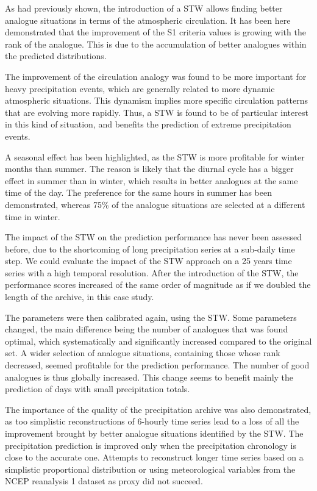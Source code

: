 \documentclass[hess]{copernicus}
\begin{document}
As \citet{Finet2008} had previously shown, the introduction of a STW allows finding better analogue situations in terms of the atmospheric circulation. It has been here demonstrated that the improvement of the S1 criteria values is growing with the rank of the analogue. This is due to the accumulation of better analogues within the predicted distributions.

The improvement of the circulation analogy was found to be more important for heavy precipitation events, which are generally related to more dynamic atmospheric situations. This dynamism implies more specific circulation patterns that are evolving more rapidly. Thus, a STW is found to be of particular interest in this kind of situation, and benefits the prediction of extreme precipitation events.

A seasonal effect has been highlighted, as the STW is more profitable for winter months than summer. The reason is likely that the diurnal cycle has a bigger effect in summer than in winter, which results in better analogues at the same time of the day. The preference for the same hours in summer has been demonstrated, whereas 75\% of the analogue situations are selected at a different time in winter.

The impact of the STW on the prediction performance has never been assessed before, due to the shortcoming of long precipitation series at a sub-daily time step. We could evaluate the impact of the STW approach on a 25 years time series with a high temporal resolution. After the introduction of the STW, the performance scores increased of the same order of magnitude as if we doubled the length of the archive, in this case study.

The parameters were then calibrated again, using the STW. Some parameters changed, the main difference being the number of analogues that was found optimal, which systematically and significantly increased compared to the original set. A wider selection of analogue situations, containing those whose rank decreased, seemed profitable for the prediction performance. The number of good analogues is thus globally increased. This change seems to benefit mainly the prediction of days with small precipitation totals.

The importance of the quality of the precipitation archive was also demonstrated, as too simplistic reconstructions of 6-hourly time series lead to a loss of all the improvement brought by better analogue situations identified by the STW. The precipitation prediction is improved only when the precipitation chronology is close to the accurate one. Attempts to reconstruct longer time series based on a simplistic proportional distribution or using meteorological variables from the NCEP reanalysis 1 dataset as proxy did not succeed.
\end{document}
